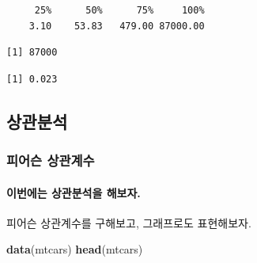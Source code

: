 \documentclass[]{article}
\newenvironment{Shaded}{\begin{snugshade}}{\end{snugshade}}
\newcommand{\KeywordTok}[1]{\textcolor[rgb]{0.13,0.29,0.53}{\textbf{#1}}}
\newcommand{\DecValTok}[1]{\textcolor[rgb]{0.00,0.00,0.81}{#1}}
\newcommand{\FloatTok}[1]{\textcolor[rgb]{0.00,0.00,0.81}{#1}}
\newcommand{\OperatorTok}[1]{\textcolor[rgb]{0.81,0.36,0.00}{\textbf{#1}}}
\newcommand{\NormalTok}[1]{#1}
\let\oldparagraph\paragraph
\renewcommand{\paragraph}[1]{\oldparagraph{#1}\mbox{}}
\begin{document}
\begin{Shaded}
\end{Shaded}

\begin{verbatim}
     25%      50%      75%     100% 
    3.10    53.83   479.00 87000.00 
\end{verbatim}

\begin{Shaded}
\end{Shaded}

\begin{verbatim}
[1] 87000
\end{verbatim}

\begin{Shaded}
\end{Shaded}

\begin{verbatim}
[1] 0.023
\end{verbatim}

\subsection{상관분석}

\subsubsection{피어슨 상관계수}\label{-}

\paragraph{이번에는 상관분석을 해보자.}\label{--.}

피어슨 상관계수를 구해보고, 그래프로도 표현해보자.

\begin{Shaded}
\begin{Highlighting}[]
\KeywordTok{data}\NormalTok{(mtcars)}
\KeywordTok{head}\NormalTok{(mtcars)}
\end{Highlighting}
\end{Shaded}
\end{document}

